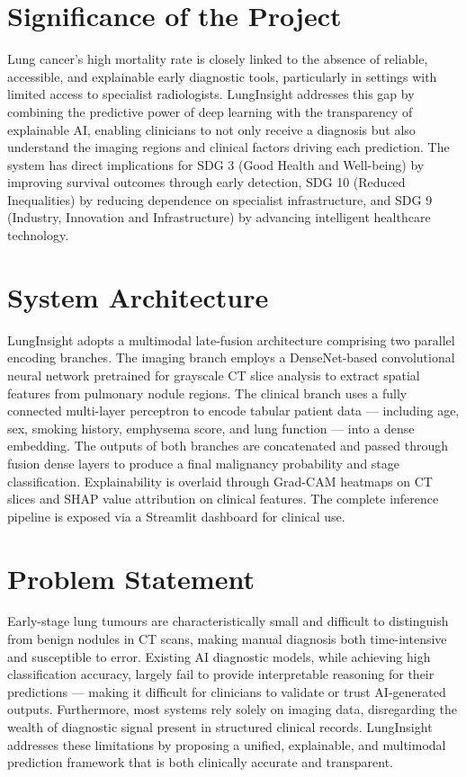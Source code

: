 {\section{Significance of the Project}
Lung cancer's high mortality rate is closely linked to the absence of reliable, accessible, and explainable early diagnostic tools, particularly in settings with limited access to specialist radiologists. LungInsight addresses this gap by combining the predictive power of deep learning with the transparency of explainable AI, enabling clinicians to not only receive a diagnosis but also understand the imaging regions and clinical factors driving each prediction. The system has direct implications for SDG 3 (Good Health and Well-being) by improving survival outcomes through early detection, SDG 10 (Reduced Inequalities) by reducing dependence on specialist infrastructure, and SDG 9 (Industry, Innovation and Infrastructure) by advancing intelligent healthcare technology.

\section{System Architecture}
LungInsight adopts a multimodal late-fusion architecture comprising two parallel encoding branches. The imaging branch employs a DenseNet-based convolutional neural network pretrained for grayscale CT slice analysis to extract spatial features from pulmonary nodule regions. The clinical branch uses a fully connected multi-layer perceptron to encode tabular patient data — including age, sex, smoking history, emphysema score, and lung function — into a dense embedding. The outputs of both branches are concatenated and passed through fusion dense layers to produce a final malignancy probability and stage classification. Explainability is overlaid through Grad-CAM heatmaps on CT slices and SHAP value attribution on clinical features. The complete inference pipeline is exposed via a Streamlit dashboard for clinical use.

\section{Problem Statement}
Early-stage lung tumours are characteristically small and difficult to distinguish from benign nodules in CT scans, making manual diagnosis both time-intensive and susceptible to error. Existing AI diagnostic models, while achieving high classification accuracy, largely fail to provide interpretable reasoning for their predictions — making it difficult for clinicians to validate or trust AI-generated outputs. Furthermore, most systems rely solely on imaging data, disregarding the wealth of diagnostic signal present in structured clinical records. LungInsight addresses these limitations by proposing a unified, explainable, and multimodal prediction framework that is both clinically accurate and transparent.

}
